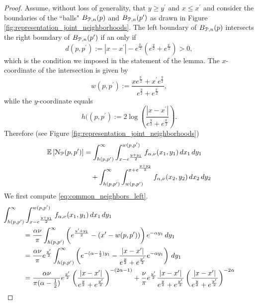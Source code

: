 \begin{appendices}
\begin{proof}
Assume, without loss of generality, that $y \ge y^\prime$ and $x \le x^\prime$ and consider the boundaries of the ``balls" $B_{{\mathcal P},n}(p)$ and $B_{{\mathcal P},n}(p^\prime)$ as drawn in Figure \ref{fig:representation_joint_neighborhoods}. The left boundary of $B_{{\mathcal P},n}(p)$ intersects the right boundary of $B_{{\mathcal P},n}(p^\prime)$ if an only if
\[
	d(p,p^\prime) := |x - x^\prime| - e^{\frac{y_\ast}{2}}\left(e^{\frac{y}{2}} + e^{\frac{y^\prime}{2}}\right) > 0,
\]
which is the condition we imposed in the statement of the lemma. The $x$-coordinate of the intersection is given by
\[
	w(p,p^\prime) := \frac{x e^{\frac{y^\prime}{2}} + x^\prime e^{\frac{y}{2}}}{e^{\frac{y}{2}} + e^{\frac{y^\prime}{2}}},
\]
while the $y$-coordinate equals
\[
	h((p,p^\prime) := 2\log\left(\frac{|x - x^\prime|}{e^{\frac{y}{2}} + e^{\frac{y^\prime}{2}}}\right).
\]
Therefore (see Figure \ref{fig:representation_joint_neighborhoods})
\begin{align}
	\mathbb{E}\left[{\mathcal N}_{{\mathcal P}}(p,p^\prime)\right] 
    &= \int_{h(p,p^\prime)}^{\infty} \int_{x-e^{\frac{y+y_1}{2}}}^{w(p,p^\prime)} f_{\alpha,\nu}(x_1,y_1) \, dx_1 \, dy_1
    	\label{eq:common_neighbors_left}\\
    &\hspace{10pt}+ \int_{h(p,p^\prime)}^{\infty} \int_{w(p,p^\prime)}^{x+e^{\frac{y+y_2}{2}}} f_{\alpha,\nu}(x_2,y_2) \, dx_2 \, dy_2
    	\label{eq:common_neighbors_right}
\end{align}
We first compute \eqref{eq:common_neighbors_left}.
\begin{align*}
	&\hspace{-30pt}\int_{h(p,p^\prime)}^{\infty} \int_{x-e^{\frac{y+y_1}{2}}}^{w(p,p^\prime)} f_{\alpha,\nu}(x_1,y_1) \, dx_1 \, dy_1\\
    &= \frac{\alpha \nu}{\pi} \int_{h(p,p^\prime)}^{\infty} \left(e^{\frac{y^\prime + y_1}{2}} - (x^\prime - w(p,p^\prime))\right) 
    	e^{-\alpha y_1} \, dy_1\\
    &= \frac{\alpha \nu}{\pi}e^{\frac{y^\prime}{2}} \int_{h(p,p^\prime)}^{\infty} \left(e^{-(\alpha -\frac{1}{2})y_1} 
    	- \frac{|x - x^\prime|}{e^{\frac{y}{2}} + e^{\frac{y^\prime}{2}}} e^{-\alpha y_1}\right) \, dy_1\\
    &= \frac{\alpha \nu}{\pi(\alpha - \frac{1}{2})}e^{\frac{y^\prime}{2}}
    	\left(\frac{|x - x^\prime|}{e^{\frac{y}{2}} + e^{\frac{y^\prime}{2}}}\right)^{-(2\alpha - 1)}
    	+ \frac{\nu}{\pi}e^{\frac{y^\prime}{2}} \frac{|x - x^\prime|}{e^{\frac{y}{2}} + e^{\frac{y^\prime}{2}}}
    	\left(\frac{|x - x^\prime|}{e^{\frac{y}{2}} + e^{\frac{y^\prime}{2}}}\right)^{-2\alpha} \\

\end{align*}
\end{proof}
\end{appendices}
